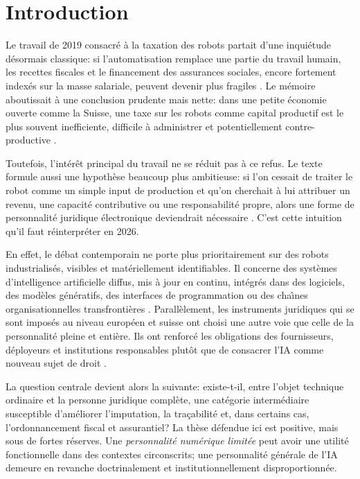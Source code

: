 \documentclass[11pt]{article}
\begin{document}
\tableofcontents
\newpage
{}

\section{Introduction}
Le travail de 2019 consacr{\'e} {\`a} la taxation des robots partait d'une inqui{\'e}tude d{\'e}sormais classique: si l'automatisation remplace une partie du travail humain, les recettes fiscales et le financement des assurances sociales, encore fortement index{\'e}s sur la masse salariale, peuvent devenir plus fragiles \citep{graz2019}. Le m{\'e}moire aboutissait {\`a} une conclusion prudente mais nette: dans une petite {\'e}conomie ouverte comme la Suisse, une taxe sur les robots comme capital productif est le plus souvent inefficiente, difficile {\`a} administrer et potentiellement contre-productive \citep{graz2019,guerreiro2019,thuemmel2018}.

Toutefois, l'int{\'e}r{\^e}t principal du travail ne se r{\'e}duit pas {\`a} ce refus. Le texte formule aussi une hypoth{\`e}se beaucoup plus ambitieuse: si l'on cessait de traiter le robot comme un simple input de production et qu'on cherchait {\`a} lui attribuer un revenu, une capacit{\'e} contributive ou une responsabilit{\'e} propre, alors une forme de personnalit{\'e} juridique {\'e}lectronique deviendrait n{\'e}cessaire \citep{graz2019,oberson2017}. C'est cette intuition qu'il faut r{\'e}interpr{\'e}ter en 2026.

En effet, le d{\'e}bat contemporain ne porte plus prioritairement sur des robots industrialis{\'e}s, visibles et mat{\'e}riellement identifiables. Il concerne des syst{\`e}mes d'intelligence artificielle diffus, mis {\`a} jour en continu, int{\'e}gr{\'e}s dans des logiciels, des mod{\`e}les g{\'e}n{\'e}ratifs, des interfaces de programmation ou des cha{\^\i}nes organisationnelles transfronti{\`e}res \citep{oecd2025adoption,oecd2025sme,wef2025jobs}. Parall{\`e}lement, les instruments juridiques qui se sont impos{\'e}s au niveau europ{\'e}en et suisse ont choisi une autre voie que celle de la personnalit{\'e} pleine et enti{\`e}re. Ils ont renforc{\'e} les obligations des fournisseurs, d{\'e}ployeurs et institutions responsables plut{\^o}t que de consacrer l'IA comme nouveau sujet de droit \citep{eu2024aiact,ec2026aiactfaq,ofcom2025swissai,coe2024framework}.

La question centrale devient alors la suivante: existe-t-il, entre l'objet technique ordinaire et la personne juridique compl{\`e}te, une cat{\'e}gorie interm{\'e}diaire susceptible d'am{\'e}liorer l'imputation, la tra{\c c}abilit{\'e} et, dans certains cas, l'ordonnancement fiscal et assurantiel? La th{\`e}se d{\'e}fendue ici est positive, mais sous de fortes r{\'e}serves. Une \emph{personnalit{\'e} num{\'e}rique limit{\'e}e} peut avoir une utilit{\'e} fonctionnelle dans des contextes circonscrits; une personnalit{\'e} g{\'e}n{\'e}rale de l'IA demeure en revanche doctrinalement et institutionnellement disproportionn{\'e}e.
\end{document}
